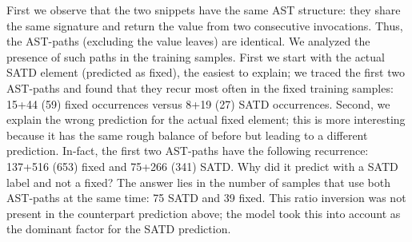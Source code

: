 First we observe that the two snippets have the same AST structure: they share the same signature and return the value from two consecutive invocations. Thus, the AST-paths (excluding the value leaves) are identical. 
We analyzed the presence of such paths in the training samples. 
First we start with the actual SATD element (predicted as fixed), the easiest to explain; we traced the first two AST-paths and found that they recur most often in the fixed training samples: 15+44 (59) fixed occurrences versus 8+19 (27) SATD occurrences. 
Second, we explain the wrong prediction for the actual fixed element; this is more interesting because it has the same rough balance of before but leading to a different prediction. In-fact, the first two AST-paths have the following recurrence: 137+516 (653) fixed and 75+266 (341) SATD. Why did it predict with a SATD label and not a fixed? The answer lies in the number of samples that use both AST-paths at the same time: 75 SATD and 39 fixed. This ratio inversion was not present in the counterpart prediction above; the model took this into account as the dominant factor for the SATD prediction. 
%
%
%

%
% 
%
%

